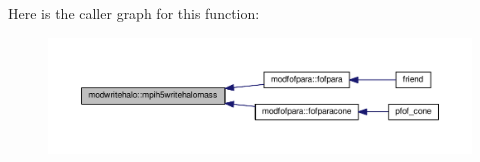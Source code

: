 Here is the caller graph for this function\+:\nopagebreak
\begin{figure}[H]
\begin{center}
\leavevmode
\includegraphics[width=350pt]{namespacemodwritehalo_a9f9dfc9671a5f395219212ba8d45204b_icgraph}
\end{center}
\end{figure}


